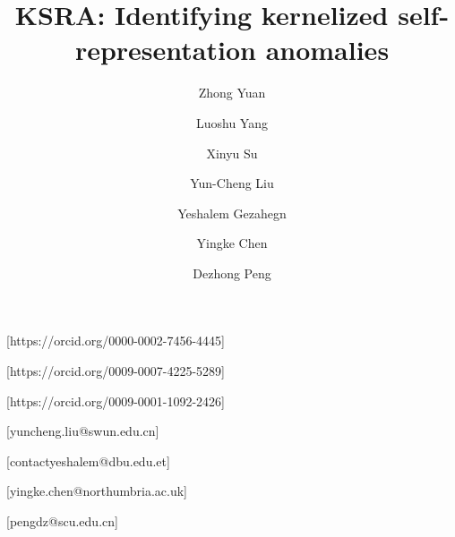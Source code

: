 \documentclass[ASNA,twocolumn]{USG} %
\begin{document}
\title{KSRA: Identifying kernelized self-representation anomalies}
\author[1]{Zhong Yuan}[https://orcid.org/0000-0002-7456-4445]
\author[1]{Luoshu Yang}[https://orcid.org/0009-0007-4225-5289]
\author[1]{Xinyu Su}[https://orcid.org/0009-0001-1092-2426]
\author[2]{Yun-Cheng Liu}[yuncheng.liu@swun.edu.cn]
\author[3]{Yeshalem Gezahegn}[contactyeshalem@dbu.edu.et]
\author[4]{Yingke Chen}[yingke.chen@northumbria.ac.uk]
\author[1]{Dezhong Peng}[pengdz@scu.edu.cn]

\address[1]{College of Computer Science, Sichuan University, Chengdu 610065, China}

\address[2]{School of Mathematics, Southwest Minzu University, Chengdu 610041, China}

\address[3]{College of Computing Science, Debre Berhan University,445 Debre Berhan, Ethiopia}

\address[4]{Department of Computer and Information Sciences, Northumbria University, Newcastle upon Tyne NE1 8ST, UK}




\end{document}
